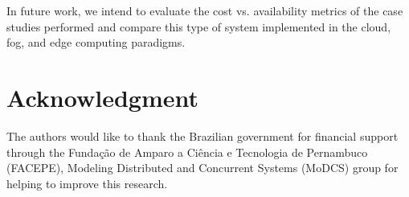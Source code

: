 \documentclass[conference]{IEEEtran}
\begin{document}
In future work, we intend to evaluate the cost vs. availability metrics of the case studies performed and compare this type of system implemented in the cloud, fog, and edge computing paradigms.

\section*{Acknowledgment}
\label{sec:acknowledgment}
The authors would like to thank the Brazilian government for financial support through the Fundação de Amparo a Ciência e Tecnologia de Pernambuco (FACEPE), Modeling Distributed and Concurrent Systems (MoDCS) group for helping to improve this research.



\end{document}
